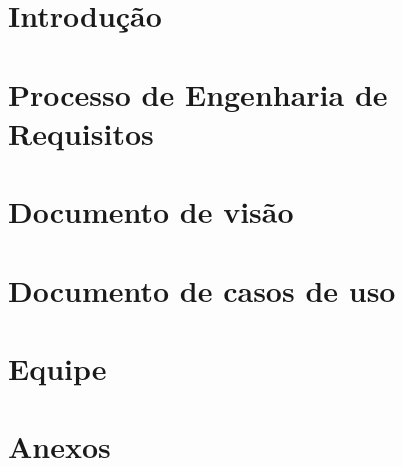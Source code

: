 \section{Introdução} %
\label{sec:introdu_o}
 
\section{Processo de Engenharia de Requisitos}
\label{sec:processo}


% 

\section{Documento de visão}
\label{sec:document_de_visao}


\section{Documento de casos de uso}
\label{sec:documento_de_caso_de_uso}


\section{Equipe} %
\label{sec:equipe}


\section{Anexos}
\label{sec:anexos}


%

%
